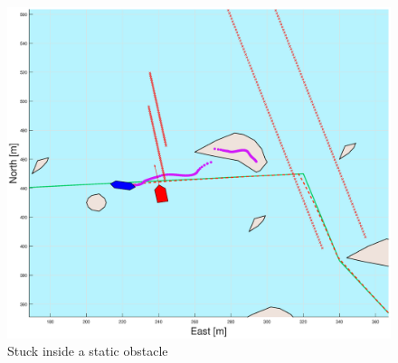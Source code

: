 \begin{figure}[b] %
    \centering
    \includegraphics[width=\textwidth]{Images/Figures/Extra_Stuff/w_optstuck}
    \caption{Stuck inside a static obstacle}
\end{figure}

